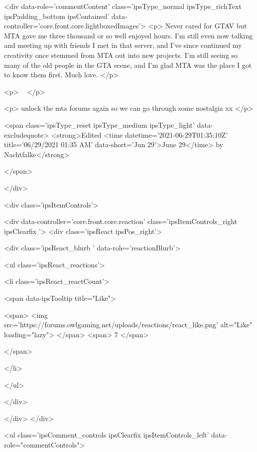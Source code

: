 		<div data-role='commentContent' class='ipsType_normal ipsType_richText ipsPadding_bottom ipsContained' data-controller='core.front.core.lightboxedImages'>
			<p>
	Never cared for GTAV but MTA gave me three thousand or so well enjoyed hours. I'm still even now talking and meeting up with friends I met in that server, and I've since continued my creativity once stemmed from MTA out into new projects. I'm still seeing so many of the old people in the GTA scene, and I'm glad MTA was the place I got to know them first. Much love.
</p>

<p>
	 
</p>

<p>
	unlock the mta forums again so we can go through some nostalgia xx
</p>


			
				

<span class='ipsType_reset ipsType_medium ipsType_light' data-excludequote>
	<strong>Edited <time datetime='2021-06-29T01:35:10Z' title='06/29/2021 01:35  AM' data-short='Jun 29'>June 29</time> by Nachtfalke</strong>
	
	
</span>
			
		</div>

		
			<div class='ipsItemControls'>
				
					
						

	<div data-controller='core.front.core.reaction' class='ipsItemControls_right ipsClearfix '>	
		<div class='ipsReact ipsPos_right'>
			
				
				<div class='ipsReact_blurb ' data-role='reactionBlurb'>
					
						

	
	<ul class='ipsReact_reactions'>
		
		
			
				
				<li class='ipsReact_reactCount'>
					
						<span data-ipsTooltip title="Like">
					
							<span>
								<img src='https://forums.owlgaming.net/uploads/reactions/react_like.png' alt="Like" loading="lazy">
							</span>
							<span>
								7
							</span>
					
						</span>
					
				</li>
			
		
	</ul>

					
				</div>
			
			
			
		</div>
	</div>

					
				
				<ul class='ipsComment_controls ipsClearfix ipsItemControls_left' data-role="commentControls">
					
